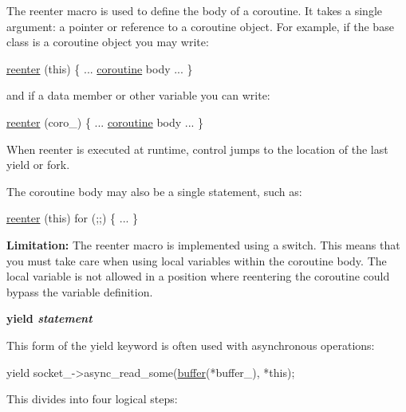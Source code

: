 The {\ttfamily reenter} macro is used to define the body of a coroutine. It takes a single argument\+: a pointer or reference to a coroutine object. For example, if the base class is a coroutine object you may write\+:


\begin{DoxyCode}
 \hyperlink{yield_8hpp_a845826f234aec2b016cac4e60aff9bb5}{reenter} (\textcolor{keyword}{this})
\{
  ... \hyperlink{classasio_1_1coroutine_aae689a0aee08699c9d68bdc9d246b5cb}{coroutine} body ...
\} 
\end{DoxyCode}


and if a data member or other variable you can write\+:


\begin{DoxyCode}
 \hyperlink{yield_8hpp_a845826f234aec2b016cac4e60aff9bb5}{reenter} (coro\_)
\{
  ... \hyperlink{classasio_1_1coroutine_aae689a0aee08699c9d68bdc9d246b5cb}{coroutine} body ...
\} 
\end{DoxyCode}


When {\ttfamily reenter} is executed at runtime, control jumps to the location of the last {\ttfamily yield} or {\ttfamily fork}.

The coroutine body may also be a single statement, such as\+:


\begin{DoxyCode}
 \hyperlink{yield_8hpp_a845826f234aec2b016cac4e60aff9bb5}{reenter} (\textcolor{keyword}{this}) for (;;)
\{
  ...
\} 
\end{DoxyCode}


{\bfseries Limitation\+:} The {\ttfamily reenter} macro is implemented using a switch. This means that you must take care when using local variables within the coroutine body. The local variable is not allowed in a position where reentering the coroutine could bypass the variable definition.

{\bfseries yield {\itshape statement}}

This form of the {\ttfamily yield} keyword is often used with asynchronous operations\+:


\begin{DoxyCode}
yield socket\_->async\_read\_some(\hyperlink{group__buffer_ga1ed66e401559cbfd19595392f653b47c}{buffer}(*buffer\_), *\textcolor{keyword}{this}); 
\end{DoxyCode}


This divides into four logical steps\+:

